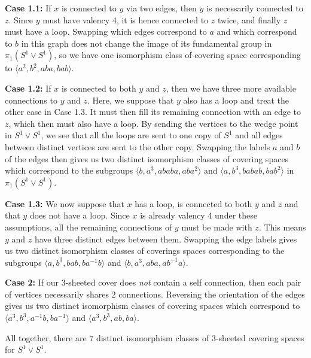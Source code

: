 \begin{homework}[e]
\begin{prf}
    \textbf{Case 1.1:} If $x$ is connected to $y$ via two edges, then $y$ is necessarily connected to $z$. Since $y$ must have valency 4, it is hence connected to $z$ twice, and finally $z$ must have a loop. Swapping which edges correspond to $a$ and which correspond to $b$ in this graph does not change the image of its fundamental group in $\pi_1(S^1\vee S^1)$, so we have one isomorphism class of covering space corresponding to $\langle a^2,b^2,aba,bab \rangle$.

    \textbf{Case 1.2:} If $x$ is connected to both $y$ and $z$, then we have three more available connections to $y$ and $z$. Here, we suppose that $y$ also has a loop and treat the other case in Case 1.3. It must then fill its remaining connection with an edge to $z$, which then must also have a loop. By sending the vertices to the wedge point in $S^1\vee S^1$, we see that all the loops are sent to one copy of $S^1$ and all edges between distinct vertices are sent to the other copy. Swapping the labels $a$ and $b$ of the edges then gives us two distinct isomorphism classes of covering spaces which correspond to the subgroups $\langle b,a^3,ababa,aba^2 \rangle$ and $\langle a,b^3,babab,bab^2 \rangle$ in $\pi_1(S^1\vee S^1)$.

    \textbf{Case 1.3:} We now suppose that $x$ has a loop, is connected to both $y$ and $z$ and that $y$ does not have a loop. Since $x$ is already valency 4 under these assumptions, all the remaining connections of $y$ must be made with $z$. This means $y$ and $z$ have three distinct edges between them. Swapping the edge labels gives us two distinct isomorphism classes of coverings spaces corresponding to the subgroups $\langle a,b^3,bab,ba^{-1}b \rangle$ and $\langle b, a^3, aba, ab^{-1}a \rangle$.

    \textbf{Case 2:} If our 3-sheeted cover does \emph{not} contain a self connection, then each pair of vertices necessarily shares 2 connections. Reversing the orientation of the edges gives us two distinct isomorphism classes of covering spaces which correspond to $\langle a^3,b^3,a^{-1}b,ba^{-1} \rangle$ and $\langle a^3, b^3, ab, ba \rangle$.
    
    All together, there are $7$ distinct isomorphism classes of $3$-sheeted covering spaces for $S^1\vee S^1$.


\end{prf}
\end{homework}
